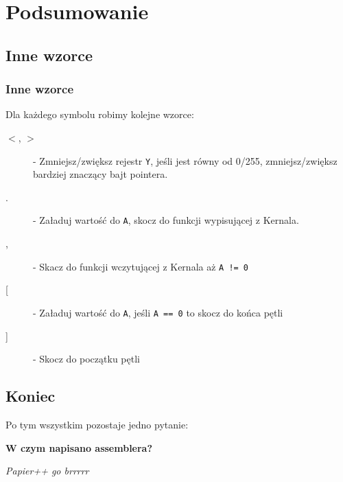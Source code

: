 \documentclass[aspectratio=169]{beamer}
\begin{document}
\section{Podsumowanie}
\subsection{Inne wzorce}
\begin{frame}
    \frametitle{Inne wzorce}
    Dla każdego symbolu robimy kolejne wzorce:
    \begin{description}
        \item[$<$, $>$] - Zmniejsz/zwiększ rejestr \texttt{Y}, jeśli jest równy od 0/255, zmniejsz/zwiększ bardziej znaczący bajt pointera.
        \item[.] - Załaduj wartość do \texttt{A}, skocz do funkcji wypisującej z Kernala.
        \item[,] - Skacz do funkcji wczytującej z Kernala aż \texttt{A != 0}
        \item[{[}] - Załaduj wartość do \texttt{A}, jeśli \texttt{A == 0} to skocz do końca pętli
        \item [{]}] - Skocz do początku pętli
    \end{description}
\end{frame}

\subsection{Koniec}
\begin{frame}
    Po tym wszystkim pozostaje jedno pytanie:
    \pause\vspace{2cm}
    \begin{center}
        \Large{\textbf{\color{blue}W czym napisano assemblera?}}
    \end{center}
    \vspace{3cm}
    \begin{flushright}
        \tiny{\textit{Papier++ go brrrrr}}
    \end{flushright}
\end{frame}
\end{document}
